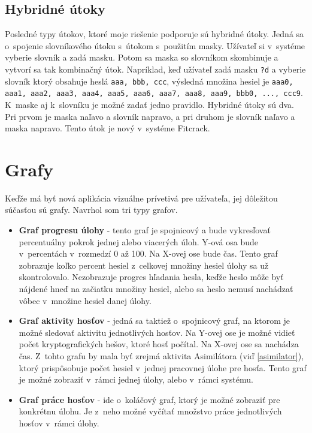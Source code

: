 \documentclass[slovak]{fitthesis}
\begin{document}
\subsection{Hybridné útoky} \label{hybridAttack}
Posledné typy útokov, ktoré moje riešenie podporuje sú hybridné útoky. Jedná sa o~spojenie slovníkového útoku s~útokom s~použitím masky. Užívateľ si v~systéme vyberie slovník a zadá masku. Potom sa maska so slovníkom skombinuje a vytvorí sa tak kombinačný útok. Napríklad, keď užívateľ zadá masku \texttt{?d} a vyberie slovník ktorý obsahuje heslá \texttt{aaa, bbb, ccc}, výsledná množina hesiel je 
\texttt{aaa0, aaa1, aaa2, aaa3, aaa4, aaa5, aaa6, aaa7, aaa8, aaa9, bbb0, ..., ccc9}. K~maske aj k~slovníku je možné zadať jedno pravidlo. Hybridné útoky sú dva. Pri prvom je maska naľavo a slovník napravo, a pri druhom je slovník naľavo a maska napravo. Tento útok je nový v~systéme Fitcrack.


\section{Grafy}\label{graphs}
Keďže má byť nová aplikácia vizuálne prívetivá pre užívateľa, jej dôležitou súčasťou sú grafy. Navrhol som tri typy grafov.
\begin{itemize}
    \item \textbf{Graf progresu úlohy} \label{progressGraph} - tento graf je spojnicový a bude vykresľovať percentuálny pokrok jednej alebo viacerých úloh. Y-ová osa bude v~percentách v~rozmedzí 0 až 100. Na X-ovej ose bude čas. Tento graf zobrazuje koľko percent hesiel z~celkovej množiny hesiel úlohy sa už skontrolovalo. Nezobrazuje progres hľadania hesla, keďže heslo môže byť nájdené hneď na začiatku množiny hesiel, alebo sa heslo nemusí nachádzať vôbec v~množine hesiel danej úlohy.
    \item \textbf{Graf aktivity hosťov} - jedná sa taktiež o~spojnicový graf, na ktorom je možné sledovať aktivitu jednotlivých hosťov. Na Y-ovej ose je možné vidieť počet kryptografických hešov, ktoré hosť počítal. Na X-ovej ose sa nachádza čas. Z~tohto grafu by mala byť zrejmá aktivita Asimilátora (viď \ref{asimilator}), ktorý prispôsobuje počet hesiel v~jednej pracovnej úlohe pre hosťa. Tento graf je možné zobraziť v~rámci jednej úlohy, alebo v~rámci systému.
    \item \textbf{Graf práce hosťov} - ide o~koláčový graf, ktorý je možné zobraziť pre konkrétnu úlohu. Je z~neho možné vyčítať množstvo práce jednotlivých hosťov v~rámci úlohy.
\end{itemize}
\end{document}
